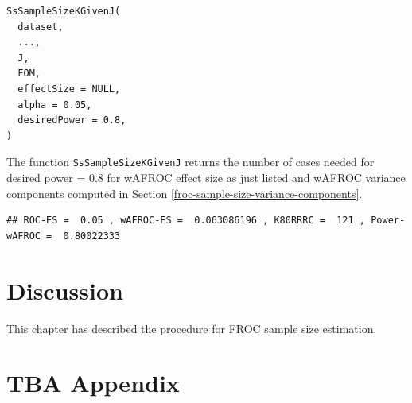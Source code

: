 \documentclass[
]{book}
\newenvironment{Shaded}{\begin{snugshade}}{\end{snugshade}}
\newcommand{\AttributeTok}[1]{\textcolor[rgb]{0.77,0.63,0.00}{#1}}
\newcommand{\ConstantTok}[1]{\textcolor[rgb]{0.00,0.00,0.00}{#1}}
\newcommand{\DecValTok}[1]{\textcolor[rgb]{0.00,0.00,0.81}{#1}}
\newcommand{\FunctionTok}[1]{\textcolor[rgb]{0.00,0.00,0.00}{#1}}
\newcommand{\NormalTok}[1]{#1}
\newcommand{\OtherTok}[1]{\textcolor[rgb]{0.56,0.35,0.01}{#1}}
\newcommand{\SpecialCharTok}[1]{\textcolor[rgb]{0.00,0.00,0.00}{#1}}
\newcommand{\StringTok}[1]{\textcolor[rgb]{0.31,0.60,0.02}{#1}}
\begin{document}
\begin{verbatim}
SsSampleSizeKGivenJ(
  dataset,
  ...,
  J,
  FOM,
  effectSize = NULL,
  alpha = 0.05,
  desiredPower = 0.8,
)
\end{verbatim}

The function \texttt{SsSampleSizeKGivenJ} returns the number of cases needed for desired power = 0.8 for wAFROC effect size as just listed and wAFROC variance components computed in Section \ref{froc-sample-size-variance-components}.

\begin{Shaded}
\end{Shaded}

\begin{verbatim}
## ROC-ES =  0.05 , wAFROC-ES =  0.063086196 , K80RRRC =  121 , Power-wAFROC =  0.80022333
\end{verbatim}

\hypertarget{discussion}{%
\section{Discussion}\label{discussion}}

This chapter has described the procedure for FROC sample size estimation.

\hypertarget{tba-appendix}{%
\section{TBA Appendix}\label{tba-appendix}}
\end{document}
